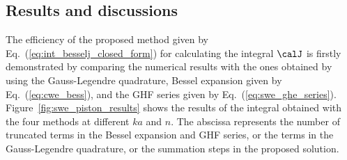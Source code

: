\subsection{Results and discussions}
The efficiency of the proposed method given by Eq.~(\ref{eq:int_besselj_closed_form}) for calculating the integral $\calJ$ is firstly demonstrated by comparing the numerical results with the ones obtained by using the Gauss-Legendre quadrature, Bessel expansion given by Eq.~(\ref{eq:cwe_bess}), and the GHF series given by Eq.~(\ref{eq:swe_ghe_series}). 
Figure~\ref{fig:swe_piston_results} shows the results of the integral obtained with the four methods at different $ka$ and $n$. 
The abscissa represents the number of truncated terms in the Bessel expansion and GHF series, or the terms in the Gauss-Legendre quadrature, or the summation steps in the proposed solution.
